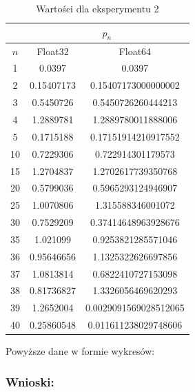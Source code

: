 \documentclass[12pt]{article}
\begin{document}
\begin{table}[!hbt]
\centering
\footnotesize
    \label{tab:table7}
    \begin{tabular}{|c|c|c|}
    		\hline
    		 & \multicolumn{2}{c|}{$p_n$} \\
    		 \hline
    		 $n$ & Float32 & Float64\\
    		\hline
    		\hline
1 & 0.0397 & 0.0397\\
\hline
2 & 0.15407173 & 0.15407173000000002\\
\hline
3 & 0.5450726 & 0.5450726260444213\\
\hline
4 & 1.2889781 & 1.2889780011888006\\
\hline
5 & 0.1715188 & 0.17151914210917552\\
\hline
\hline
10 & 0.7229306 & 0.722914301179573\\
\hline
15 & 1.2704837 & 1.2702617739350768\\
\hline
20 & 0.5799036 & 0.5965293124946907\\
\hline
25 & 1.0070806 & 1.315588346001072\\
\hline
30 & 0.7529209 & 0.37414648963928676\\
\hline
\hline
35 & 1.021099 & 0.9253821285571046\\
\hline
36 & 0.95646656 & 1.1325322626697856\\
\hline
37 & 1.0813814 & 0.6822410727153098\\
\hline
38 & 0.81736827 & 1.3326056469620293\\
\hline
39 & 1.2652004 & 0.0029091569028512065\\
\hline
40 & 0.25860548 & 0.011611238029748606\\
\hline
    \end{tabular}
    \caption{Wartości dla eksperymentu 2}
\end{table}

Powyższe dane w formie wykresów:

\newpage
\subsubsection*{Wnioski:}
\end{document}
